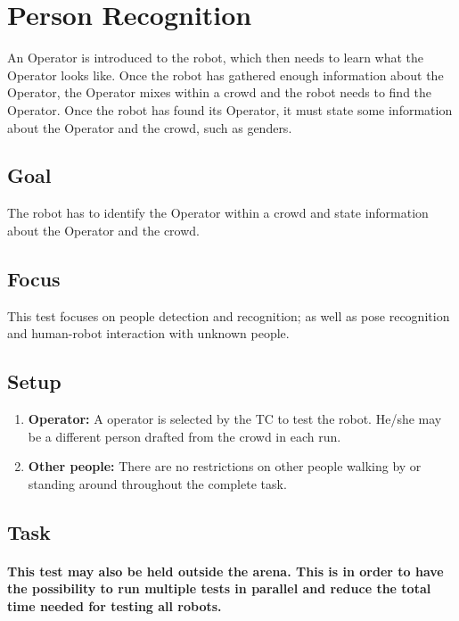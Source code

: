 \section{Person Recognition}

An Operator is introduced to the robot, which then needs to learn what the Operator looks like. Once the robot has gathered enough information about the Operator, the Operator mixes within a crowd and the robot needs to find the Operator. Once the robot has found its Operator, it must state some information about the Operator and the crowd, such as genders.

\subsection{Goal}
The robot has to identify the Operator within a crowd and state information about the Operator and the crowd.

\subsection{Focus}

This test focuses on people detection and recognition; as well as pose recognition and human-robot interaction with unknown people.

\subsection{Setup}

\begin{enumerate}
\item \textbf{Operator:} A  operator is selected by the TC to test the robot. 
  He/she may be a different person drafted from the crowd in each run.
\item \textbf{Other people:} There are no restrictions on other people walking by or standing around throughout the complete task.
\end{enumerate}

\subsection{Task}
\paragraph{This test may also be held outside the arena.
  This is in order to have the possibility to run multiple tests in parallel and reduce the total time needed for testing all robots.}

